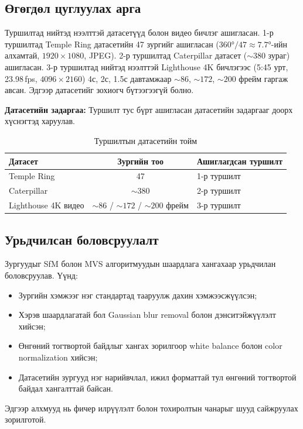 \clearpage
\subsection{Өгөгдөл цуглуулах арга}

Туршилтад нийтэд нээлттэй датасетүүд болон видео бичлэг ашигласан. 1-р туршилтад Temple Ring датасетийн 47 зургийг ашигласан ($360°/47\approx 7.7°$-ийн алхамтай, $1920\times1080$, JPEG). 2-р туршилтад Caterpillar датасет (${\sim}380$ зураг) ашигласан. 3-р туршилтад нийтэд нээлттэй Lighthouse 4K бичлэгээс (5:45 урт, 23.98\,fps, $4096\times2160$) 4с, 2с, 1.5с давтамжаар ${\sim}86$, ${\sim}172$, ${\sim}200$ фрейм гаргаж авсан. Эдгээр датасетийг зохиогч бүтээгээгүй болно.

\textbf{Датасетийн задаргаа:} Туршилт тус бүрт ашигласан датасетийн задаргааг доорх хүснэгтэд харуулав.

\begin{table}[H]
\centering
\caption{Туршилтын датасетийн тойм}
\label{tab:dataset_summary}
\begin{tabular}{|l|c|l|}
\hline
\textbf{Датасет} & \textbf{Зургийн тоо} & \textbf{Ашиглагдсан туршилт} \\ \hline
Temple Ring & 47 & 1-р туршилт \\ \hline
Caterpillar & ${\sim}380$ & 2-р туршилт \\ \hline
Lighthouse 4K видео & ${\sim}86$ / ${\sim}172$ / ${\sim}200$ фрейм & 3-р туршилт \\ \hline
\end{tabular}
\end{table}

\subsection{Урьдчилсан боловсруулалт}
Зургуудыг SfM болон MVS алгоритмуудын шаардлага хангахаар урьдчилан боловсруулав. Үүнд:
\begin{itemize}
    \item Зургийн хэмжээг нэг стандартад тааруулж дахин хэмжээсжүүлсэн;
    \item Хэрэв шаардлагатай бол Gaussian blur removal болон дэнситэйжүүлэлт хийсэн;
    \item Өнгөний тогтвортой байдлыг хангах зорилгоор white balance болон color normalization хийсэн;
    \item Датасетийн зургууд нэг нарийвчлал, ижил форматтай тул өнгөний тогтвортой байдал хангалттай байсан.
\end{itemize}
Эдгээр алхмууд нь фичер илрүүлэлт болон тохиролтын чанарыг шууд сайжруулах зорилготой.


